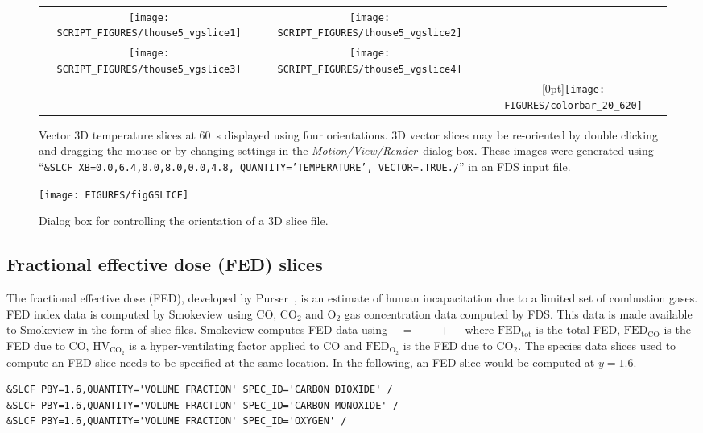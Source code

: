 \documentclass[11pt,twoside]{book}
\begin{document}
\begin{figure}[\figoptions]
\begin{center}
\begin{tabular}{ccc}
\texttt{[image: SCRIPT\_FIGURES/thouse5\_vgslice1]}&
\texttt{[image: SCRIPT\_FIGURES/thouse5\_vgslice2]}\\
\texttt{[image: SCRIPT\_FIGURES/thouse5\_vgslice3]}&
\texttt{[image: SCRIPT\_FIGURES/thouse5\_vgslice4]}&\\
&&\raisebox{0.0ex}[0pt]{\texttt{[image: FIGURES/colorbar\_20\_620]}}\\
\end{tabular}
\caption [General oriented vector temperature slices.]
{
Vector 3D temperature slices at 60~s displayed using four orientations.
3D vector slices may be re-oriented by double clicking and dragging the mouse
or by changing settings in the {\em Motion/View/Render}\ dialog box.
These images were generated using
``{\tt \&SLCF XB=0.0,6.4,0.0,8.0,0.0,4.8, QUANTITY='TEMPERATURE', VECTOR=.TRUE./}'' in an FDS
input file. }
\label{figvgslice}%
\end{center}
\end{figure}

\begin{figure}[\figoptions]
\centerline{
\texttt{[image: FIGURES/figGSLICE]}
} \caption[Dialog box for controlling the orientation of a 3D slice file.]{Dialog box for controlling the orientation of a 3D slice file.} \label{figGSLICE}
\end{figure}

\subsection{Fractional effective dose (FED) slices}
The fractional effective dose (FED), developed by Purser~\cite{SFPE:Purser},
is an estimate of human incapacitation
due to a limited set of combustion gases.
FED index data is computed by Smokeview using CO, $\mathrm{CO_2}$ and $\mathrm{O_2}$ gas
concentration data computed by FDS.
This data is made available to Smokeview in the form of slice files.
Smokeview computes FED data using
\be
{}_ = _
\times {}_ + _
\ee
where $\mathrm{FED}_\mathrm{tot}$ is the total FED,
$\mathrm{FED}_\mathrm{CO}$ is the FED due to CO,
$\mathrm{HV}_\mathrm{CO_2}$ is a hyper-ventilating factor
applied to CO and $\mathrm{FED}_\mathrm{O_2}$
is the FED due to $\mathrm{CO_2}$.
The species data slices used to compute an FED slice needs to be specified at the
same location.  In the following, an FED slice would be computed at $y=1.6$.
\begin{lstlisting}
&SLCF PBY=1.6,QUANTITY='VOLUME FRACTION' SPEC_ID='CARBON DIOXIDE' /
&SLCF PBY=1.6,QUANTITY='VOLUME FRACTION' SPEC_ID='CARBON MONOXIDE' /
&SLCF PBY=1.6,QUANTITY='VOLUME FRACTION' SPEC_ID='OXYGEN' /
\end{lstlisting}
\end{document}
